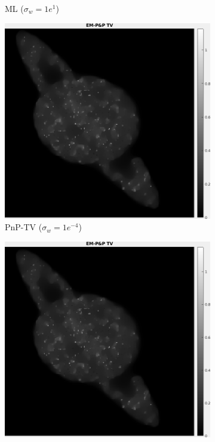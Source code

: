 \documentclass[a4paper, 11pt]{article}
\begin{document}
\begin{figure}[h]
\begin{subfigure}[b]{0.22\textwidth}
        \caption{\tiny ML ($\sigma_w=1e^{1}$)}
        \label{fig:ML1}
    \end{subfigure}
    \begin{subfigure}[b]{0.22\textwidth}
        \includegraphics[width=\textwidth]{../Figures/PnPReconstructionNoiseSigma1e-4.png}
        \caption{\tiny PnP-TV ($\sigma_w=1e^{-4}$)}
        \label{fig:PnP-2}
    \end{subfigure}
    \begin{subfigure}[b]{0.22\textwidth}
        \includegraphics[width=\textwidth]{../Figures/PnPReconstructionNoiseSigma1e-3.png}

\end{subfigure}
\end{figure}
\end{document}
